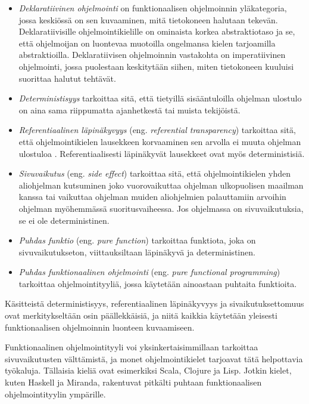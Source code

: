 \begin{itemize}
	\item \textit{Deklaratiivinen ohjelmointi} on funktionaalisen ohjelmoinnin yläkategoria, jossa keskiössä on sen kuvaaminen, mitä tietokoneen halutaan tekevän. Deklaratiivisille ohjelmointikielille on ominaista korkea abstraktiotaso ja se, että ohjelmoijan on luontevaa muotoilla ongelmansa kielen tarjoamilla abstraktioilla. Deklaratiivisen ohjelmoinnin vastakohta on imperatiivinen ohjelmointi, jossa puolestaan keskitytään siihen, miten tietokoneen kuuluisi suorittaa halutut tehtävät.

	\item \textit{Deterministisyys} tarkoittaa sitä, että tietyillä sisääntuloilla ohjelman ulostulo on aina sama riippumatta ajanhetkestä tai muista tekijöistä.

	\item \textit{Referentiaalinen läpinäkyvyys} (eng. \textit{referential transparency}) tarkoittaa sitä, että ohjelmointikielen lausekkeen korvaaminen sen arvolla ei muuta ohjelman ulostuloa \citep{hudak1989conception}. Referentiaalisesti läpinäkyvät lausekkeet ovat myös deterministisiä.

	\item \textit{Sivuvaikutus} (eng. \textit{side effect}) tarkoittaa sitä, että ohjelmointikielen yhden aliohjelman kutsuminen joko vuorovaikuttaa ohjelman ulkopuolisen maailman kanssa tai vaikuttaa ohjelman muiden aliohjelmien palauttamiin arvoihin ohjelman myöhemmässä suoritusvaiheessa. Jos ohjelmassa on sivuvaikutuksia, se ei ole deterministinen.

	\item \textit{Puhdas funktio} (eng. \textit{pure function}) tarkoittaa funktiota, joka on sivuvaikutukseton, viittauksiltaan läpinäkyvä ja deterministinen.

	\item \textit{Puhdas funktionaalinen ohjelmointi} (eng. \textit{pure functional programming}) tarkoittaa ohjelmointityyliä, jossa käytetään ainoastaan puhtaita funktioita.
\end{itemize}

Käsitteistä deterministisyys, referentiaalinen läpinäkyvyys ja sivaikutuksettomuus ovat merkitykseltään osin päällekkäisiä, ja niitä kaikkia käytetään yleisesti funktionaalisen ohjelmoinnin luonteen kuvaamiseen.

Funktionaalinen ohjelmointityyli voi yksinkertaisimmillaan tarkoittaa sivuvaikutusten välttämistä, ja monet ohjelmointikielet tarjoavat tätä helpottavia työkaluja. Tällaisia kieliä ovat esimerkiksi Scala, Clojure ja Lisp. Jotkin kielet, kuten Haskell ja Miranda, rakentuvat pitkälti puhtaan funktionaalisen ohjelmointityylin ympärille.

